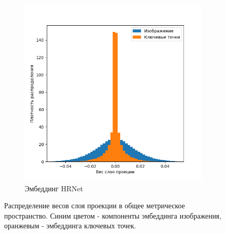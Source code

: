 \begin{figure}[ht]
\begin{subfigure}[b]{0.45\textwidth}
		\includegraphics{images/results/analyze_model/concat_hrnet_normalize.png}
		\caption{Эмбеддинг HRNet}
		\label{fig:proj_weights_hrnet}
	\end{subfigure}
	\caption{Распределение весов слоя проекции в общее метрическое пространство. Синим цветом - компоненты эмбеддинга изображения, оранжевым - эмбеддинга ключевых точек.}
	\label{fig:proj_weights}
\end{figure}




